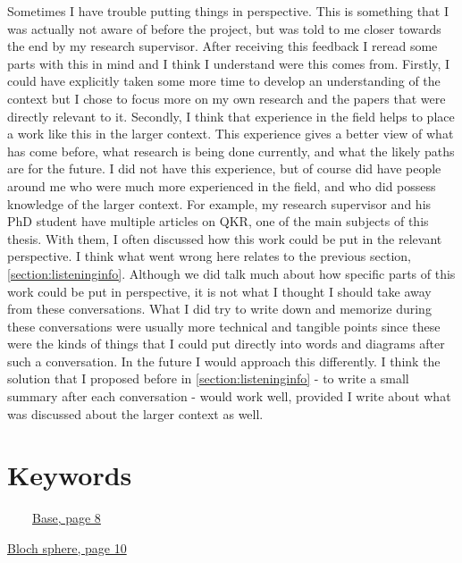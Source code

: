 \documentclass[]{article}
\begin{document}
Sometimes I have trouble putting things in perspective. This is something that I was actually not aware of before the project, but was told to me closer towards the end by my research supervisor. After receiving this feedback I reread some parts with this in mind and I think I understand were this comes from. Firstly, I could have explicitly taken some more time to develop an understanding of the context but I chose to focus more on my own research and the papers that were directly relevant to it. Secondly, I think that experience in the field helps to place a work like this in the larger context. This experience gives a better view of what has come before, what research is being done currently, and what the likely paths are for the future. I did not have this experience, but of course did have people around me who were much more experienced in the field, and who did possess knowledge of the larger context. For example, my research supervisor and his PhD student have multiple articles on QKR, one of the main subjects of this thesis. With them, I often discussed how this work could be put in the relevant perspective. I think what went wrong here relates to the previous section, \ref{section:listeninginfo}. Although we did talk much about how specific parts of this work could be put in perspective, it is not what I thought I should take away from these conversations. What I did try to write down and memorize during these conversations were usually more technical and tangible points since these were the kinds of things that I could put directly into words and diagrams after such a conversation. In the future I would approach this differently. I think the solution that I proposed before in \ref{section:listeninginfo} - to write a small summary after each conversation - would work well, provided I write about what was discussed about the larger context as well.

\newpage



\appendix


\section{Keywords}
\label{Keywords}


~~~~\hyperref[coloursandbases]{Base, page 8}

\hyperref[section:basisandphasetranslations]{Bloch sphere, page 10}
\end{document}

